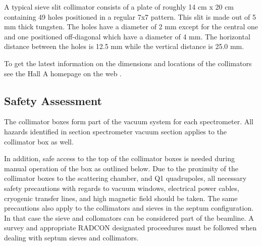 A typical sieve slit collimator 
consists of a plate of roughly 14 cm x 20 cm containing 49 holes
positioned in a regular 7x7 pattern. This slit is made out of 5
mm thick tungsten.
The holes have a diameter of 2 mm except for the central one and one positioned
off-diagonal which have a diameter of 4 mm. The horizontal distance between the
holes is 12.5 mm while the vertical distance is 25.0 mm.
%

To get the latest information on the dimensions and locations of the collimators see 
the Hall A homepage on the web%
.

\begin{safetyen}{10}{15}
\subsection{Safety Assessment}

The collimator boxes form part of the vacuum system for each spectrometer. All hazards
identified in section spectrometer vacuum section applies to the collimator box as well.

In addition, safe access to the top of
the collimator boxes is needed  during manual operation of the box as outlined below.
Due to the proximity of the collimator boxes to the scattering chamber, and Q1 quadrupoles,
all necessary safety precautions with regards to vacuum windows, electrical power cables, 
cryogenic transfer lines, and high magnetic field should be taken. The same precautions also apply 
to the collimators and sieves in the septum configuration. In that case the sieve and collomators
can be considered part of the beamline. A survey and
appropriate RADCON designated proceedures must be followed when dealing with septum sieves 
and collimators.
\end{safetyen}


